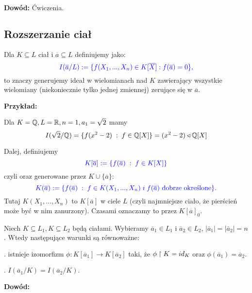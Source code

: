 \textbf{Dowód:} Ćwiczenia.

\subsection{Rozszerzanie ciał}

Dla $K\subseteq L$ ciał i $\overline a\subseteq L$ definiujemy  jako:
$$\color{blue}I(\overline a /L):=\{f(X_1,...,X_n)\in K[\overline X]:f(\overline a)=0\},$$
to znaczy generujemy ideał w wielomianach nad $K$ zawierający wszystkie wielomiany (niekoniecznie tylko jednej zmiennej) zerujące się w $\overline a$. 
\medskip

\textbf{Przykład:}
\smallskip

Dla $K=\mathbb{Q},L=\mathbb{R},n=1,a_1=\sqrt{2}$ mamy
$$I(\sqrt{2}/\mathbb{Q})=\{f(x^2-2)\;:\;f\in\mathbb{Q}[X]\}=(x^2-2)\triangleleft \mathbb{Q}[X]$$

Dalej, definiujemy
$$\color{blue}K[\overline a]:=\{f(\overline a)\;:\;f\in K[X]\}$$
czyli  oraz  generowane przez $K\cup\{\overline a\}$:
$$\color{blue}K(\overline a):=\{f(\overline a)\;:\;f\in K(X_1,...,X_n)\;i\;f(\overline a)\text{ dobrze określone}\}.$$
Tutaj $K(X_1,...,X_n)$ to  $K[\overline a]$ w ciele $L$ (czyli najmniejsze ciało, że pierścień może być w nim zanurzony). Czasami oznaczamy to przez $K[\overline a]_0$.
\medskip



\begin{uwaga}
    \label{uwga:1:1:5}
    Niech $K\subseteq L_1,K\subseteq L_2$ będą ciałami. Wybieramy $\overline a_1\in L_1$ i $\overline a_2\in L_2$, $|\overline a_1|=|\overline a_2|=n$. Wtedy następujące warunki są równoważne:

. istnieje izomorfizm $\phi:K[\overline a_1]\to K[\overline a_2]$ taki, że $\phi\upharpoonright K=id_K$ oraz $\phi(\overline a_1)=\overline a_2$.

. $I(\overline a_1/K)=I(\overline a_2/K)$.
\end{uwaga}

\textbf{Dowód:}


